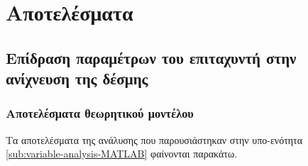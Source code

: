 \chapter{Αποτελέσματα}


\section{Επίδραση παραμέτρων του επιταχυντή στην ανίχνευση της δέσμης}

\subsection{Αποτελέσματα θεωρητικού μοντέλου}
Τα αποτελέσματα της ανάλυσης που παρουσιάστηκαν στην υπο-ενότητα \ref{sub:variable-analysis-MATLAB} φαίνονται παρακάτω.

